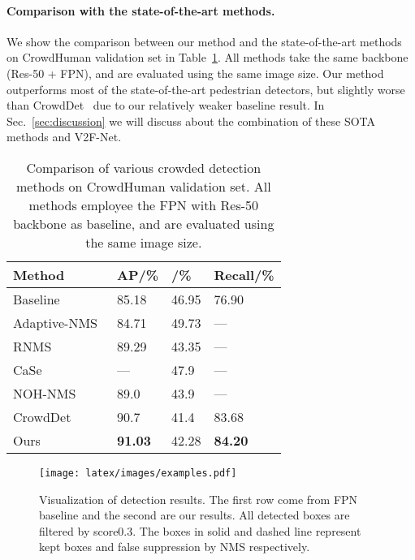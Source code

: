 \documentclass[10pt,twocolumn,letterpaper]{article}
\begin{document}
\paragraph{Comparison with the state-of-the-art methods.} We show the comparison between our method and the state-of-the-art methods on CrowdHuman validation set in Table~\ref{tbl:crowdhuman_eval}. All methods take the same backbone (Res-50 + FPN), and are evaluated using the same image size. Our method outperforms most of the state-of-the-art pedestrian detectors, but slightly worse than CrowdDet~\cite{chu2020crowddet} due to our relatively weaker baseline result. In Sec.~\ref{sec:discussion} we will discuss about the combination of these SOTA methods and V2F-Net.
\begin{table}[ht]
   \centering
   \footnotesize
   \caption{Comparison of various crowded detection methods on CrowdHuman validation set. All methods employee the FPN with Res-50 backbone as baseline, and are evaluated using the same image size.}
   \label{tbl:crowdhuman_eval}
   \begin{tabularx}{1.\linewidth}{p{40mm}<{\centering}|X<{\centering}X<{\centering}X<{\centering}}
   \toprule
       Method & AP/\% & /\% & Recall/\%\\
       \hline
        Baseline & 85.18 & 46.95 & 76.90 \\
       \hline
       Adaptive-NMS~\cite{adaptiveNMS} & 84.71 & 49.73 & --- \\
       RNMS~\cite{huang2020R2nms} & 89.29 & 43.35 & --- \\
       CaSe~\cite{xie2020count} & --- & 47.9 & ---\\
       NOH-NMS~\cite{zhou2020NOH-NMS} & 89.0 & 43.9 & ---\\
       CrowdDet~\cite{chu2020crowddet} & 90.7 & 41.4 & 83.68 \\
       \hline
       Ours & \textbf{91.03} & 42.28  & \textbf{84.20}\\
       \bottomrule
   \end{tabularx}
\end{table}




\begin{figure*}[!t]
\begin{center}
 \texttt{[image: latex/images/examples.pdf]}
\end{center}
   \caption{Visualization of detection results. The first row come from FPN baseline and the second are our results. All detected boxes are filtered by score0.3. The boxes in solid and dashed line represent kept boxes and false suppression by NMS respectively.}
\label{fig:example_cropped}
\end{figure*}
\end{document}
